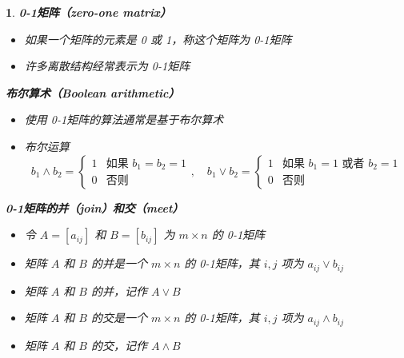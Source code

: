\documentclass[UTF8]{report}
\theoremstyle{MyLineTheoremStyle} %
\theoremstyle{MyBlockTheoremStyle} %
\theoremstyle{MySubsubsectionStyle} %
\newtheorem{definition}{}
\begin{document}
\begin{definition}
    \textbf{0-1矩阵（zero-one matrix）}\par
        \begin{itemize}
            \item 如果一个矩阵的元素是 0 或 1，称这个矩阵为 0-1矩阵
            \item 许多离散结构经常表示为 0-1矩阵
        \end{itemize}
        \textbf{布尔算术（Boolean arithmetic）}\par
        \begin{itemize}
            \item 使用 0-1矩阵的算法通常是基于布尔算术
            \item 布尔运算
            \[
            b_1 \land b_2 = 
            \begin{cases}
            1 & \text{如果 } b_1 = b_2 = 1 \\
            0 & \text{否则}
            \end{cases}
            , \quad
            b_1 \lor b_2 = 
            \begin{cases}
            1 & \text{如果 } b_1 = 1 \text{ 或者 } b_2 = 1 \\
            0 & \text{否则}
            \end{cases}
            \]
        \end{itemize}

        \textbf{0-1矩阵的并（join）和交（meet）}\par
        \begin{itemize}
            \item 令 $A = [a_{ij}]$ 和 $B = [b_{ij}]$ 为 $m \times n$ 的 0-1矩阵
            \item 矩阵 $A$ 和 $B$ 的并是一个 $m \times n$ 的 0-1矩阵，其 $i,j$ 项为 $a_{ij} \lor b_{ij}$
            \item 矩阵 $A$ 和 $B$ 的并，记作 $A \lor B$
            \item 矩阵 $A$ 和 $B$ 的交是一个 $m \times n$ 的 0-1矩阵，其 $i,j$ 项为 $a_{ij} \land b_{ij}$
            \item 矩阵 $A$ 和 $B$ 的交，记作 $A \land B$
        \end{itemize}
    

\end{definition}
\end{document}
